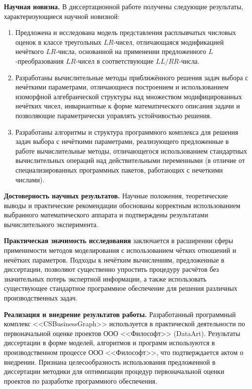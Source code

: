 \textbf{Научная новизна.} В диссертационной работе получены следующие результаты, характеризующиеся научной новизной:
\begin{enumerate}
  \item Предложена и исследована модель представления расплывчатых числовых оценок в классе треугольных $LR$-чисел, отличающаяся модификацией нечёткого $LR$-числа, основанной на применении предложенного $L$-преобразования $LR$-чисел в соответствующие $LL/RR$-числа.
  \item Разработаны вычислительные методы приближённого решения задач выбора с нечёткими параметрами, отличающиеся построением и использованием изоморфной алгебраической структуры над множеством модифицированных нечётких чисел, инвариантные к форме математического описания задачи и позволяющие параметрически управлять устойчивостью решения.
  \item Разработаны алгоритмы и структура программного комплекса для решения задач выбора с нечёткими параметрами, реализующего предложенные в работе вычислительные методы, отличающегося использованием стандартных вычислительных операций над действительными переменными (в отличие от специализированных программных пакетов, работающих с нечеткими числами).
\end{enumerate}

\textbf{Достоверность научных результатов.} Научные положения, теоретические выводы и практические рекомендации обоснованы корректным использованием выбранного математического аппарата и подтверждены результатами вычислительного эксперимента.

\textbf{Практическая значимость исследования} заключается в расширении сферы применимости методов моделирования с использованием чётких отношений и нечётких параметров. Подходы к нечётким вычислениям, предложенные в диссертации, позволяют существенно упростить процедуру расчётов без значительных потерь экспертной информации, а также использовать существующее стандартное программное обеспечение для решения различных производственных задач.

\textbf{Реализация и внедрение результатов работы.} Разработанный программный комплекс <<CSBusinessGraph>> используется в практической деятельности по первоначальной оценке проектов ООО <<Философт>> (DataArt). Результаты диссертации в форме моделей, алгоритмов и программ используются в производственном процессе ООО <<Философт>>, что подтверждается актом о внедрении. Признана целесообразность использования предложенной в диссертации методики для оптимизации процедур первоначальной оценки проектов по разработке программного обеспечения.

